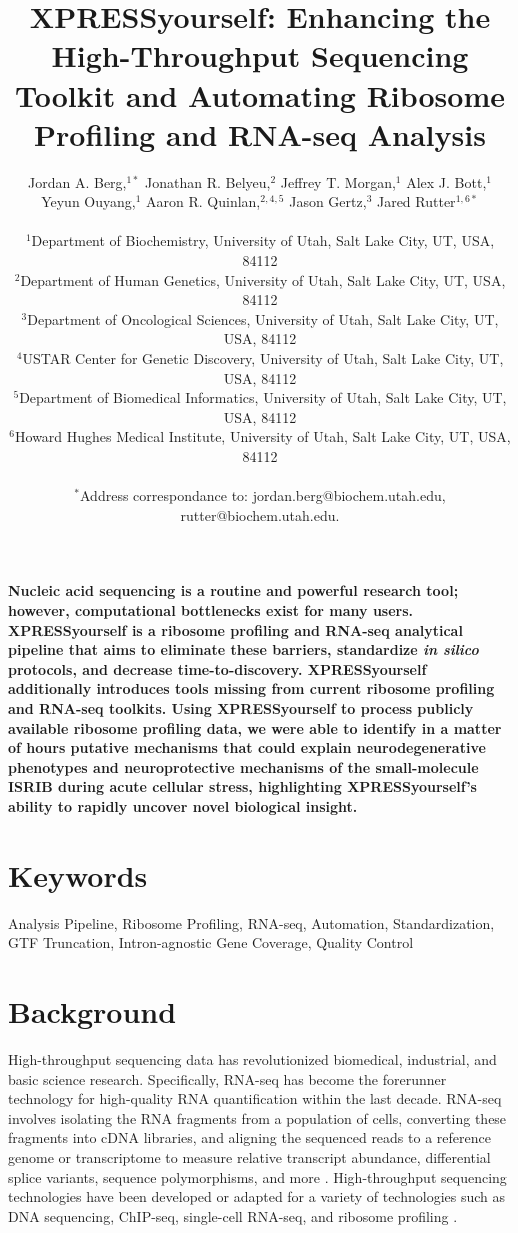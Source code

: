 \documentclass[10pt, oneside]{article}
\title{
XPRESSyourself: Enhancing the High-Throughput Sequencing Toolkit and Automating Ribosome Profiling and RNA-seq Analysis
}
\author{
Jordan A. Berg,$^{1\ast}$ Jonathan R. Belyeu,$^{2}$ Jeffrey T. Morgan,$^{1}$ Alex J. Bott,$^{1}$ \\
Yeyun Ouyang,$^{1}$ Aaron R. Quinlan,$^{2,4,5}$ Jason Gertz,$^{3}$ Jared Rutter$^{1,6\ast}$ \\
\\
\normalsize{$^{1}$Department of Biochemistry, University of Utah, Salt Lake City, UT, USA, 84112}\\
\normalsize{$^{2}$Department of Human Genetics, University of Utah, Salt Lake City, UT, USA, 84112}\\
\normalsize{$^{3}$Department of Oncological Sciences, University of Utah, Salt Lake City, UT, USA, 84112}\\
\normalsize{$^{4}$USTAR Center for Genetic Discovery, University of Utah, Salt Lake City, UT, USA, 84112}\\
\normalsize{$^{5}$Department of Biomedical Informatics, University of Utah, Salt Lake City, UT, USA, 84112}\\
\normalsize{$^{6}$Howard Hughes Medical Institute, University of Utah, Salt Lake City, UT, USA, 84112}\\
\\
\normalsize{$^\ast$Address correspondance to: jordan.berg@biochem.utah.edu, rutter@biochem.utah.edu.}\\
}
\date{}
\begin{document}
\baselineskip24pt

\setlength{\parindent}{2em}

\maketitle

\textbf{Nucleic acid sequencing is a routine and powerful research tool; however, computational bottlenecks exist for many users. XPRESSyourself is a ribosome profiling and RNA-seq analytical pipeline that aims to eliminate these barriers, standardize \textit{in silico} protocols, and decrease time-to-discovery. XPRESSyourself additionally introduces tools missing from current ribosome profiling and RNA-seq toolkits. Using XPRESSyourself to process publicly available ribosome profiling data, we were able to identify in a matter of hours putative mechanisms that could explain neurodegenerative phenotypes and neuroprotective mechanisms of the small-molecule ISRIB during acute cellular stress, highlighting XPRESSyourself's ability to rapidly uncover novel biological insight.}

\section*{Keywords}
Analysis Pipeline, Ribosome Profiling, RNA-seq, Automation, Standardization, GTF Truncation, Intron-agnostic Gene Coverage, Quality Control

\section{Background}
High-throughput sequencing data has revolutionized biomedical, industrial, and basic science research. Specifically, RNA-seq has become the forerunner technology for high-quality RNA quantification within the last decade. RNA-seq involves isolating the RNA fragments from a population of cells, converting these fragments into cDNA libraries, and aligning the sequenced reads to a reference genome or transcriptome to measure relative transcript abundance, differential splice variants, sequence polymorphisms, and more \cite{byron_nrg}. High-throughput sequencing technologies have been developed or adapted for a variety of technologies such as DNA sequencing, ChIP-seq, single-cell RNA-seq, and ribosome profiling \cite{ingolia_science}. \\
\end{document}
